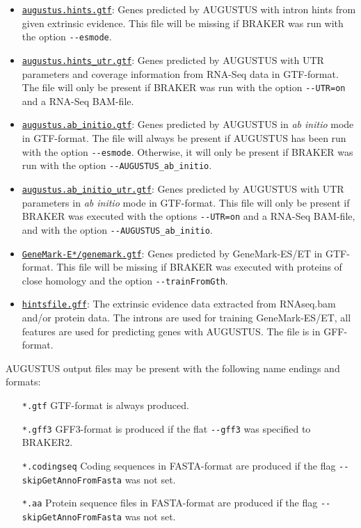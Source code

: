 \documentclass[a4paper,10pt]{report}
\begin{document}
\begin{itemize}
	\item \underline{\texttt{augustus.hints.gtf}}: Genes predicted by AUGUSTUS with intron hints from given extrinsic evidence. This file will be missing if BRAKER was run with the option \texttt{-{}-esmode}. 
	
	
	\item \underline{\texttt{augustus.hints\_utr.gtf}}: Genes predicted by AUGUSTUS with UTR parameters and coverage information from RNA-Seq data in GTF-format. The file will only be present if BRAKER was run with the option \texttt{-{}-UTR=on} and a RNA-Seq BAM-file. 
	
	
	\item \underline{\texttt{augustus.ab\_initio.gtf}}: Genes predicted by AUGUSTUS in \textit{ab initio} mode in GTF-format. The file will always be present if AUGUSTUS has been run with the option \texttt{-{}-esmode}. Otherwise, it will only be present if BRAKER was run with the option \texttt{-{}-AUGUSTUS\_ab\_initio}.
	
	\item \underline{\texttt{augustus.ab\_initio\_utr.gtf}}: Genes predicted by AUGUSTUS with UTR parameters in \textit{ab initio} mode in GTF-format. This file will only be present if BRAKER was executed with  the options \texttt{-{}-UTR=on} and a RNA-Seq BAM-file, and with the option \texttt{-{}-AUGUSTUS\_ab\_initio}.
	
	\item \underline{\texttt{GeneMark-E*/genemark.gtf}}: Genes predicted by GeneMark-ES/ET in GTF-format. This file will be missing if BRAKER was executed with proteins of close homology and the option \texttt{-{}-trainFromGth}.
	
	\item \underline{\texttt{hintsfile.gff}}: The extrinsic evidence data extracted from RNAseq.bam and/or protein
	data. The introns are used for training GeneMark-ES/ET, all features
	are used for predicting genes with AUGUSTUS. The file is in GFF-format.
\end{itemize}

AUGUSTUS output files may be present with the following name endings and formats:

\begin{itemize}
	\item[\texttt{*.gtf}] GTF-format is always produced.
	\item[\texttt{*.gff3}] GFF3-format is produced if the flat \texttt{-{}-gff3} was specified to BRAKER2.
	\item[\texttt{*.codingseq}] Coding sequences in FASTA-format are produced if the flag \texttt{-{}-skipGetAnnoFromFasta} was not set.
	\item[\texttt{*.aa}] Protein sequence files in FASTA-format are produced if the flag \texttt{-{}-skipGetAnnoFromFasta} was not set.
\end{itemize}
\end{document}
